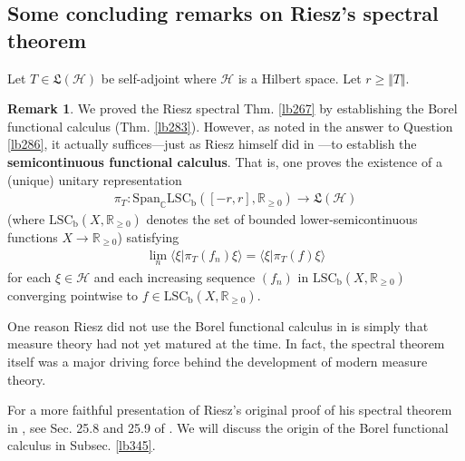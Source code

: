 \documentclass[12pt,b5paper,notitlepage]{article}
\theoremstyle{definition}
\newtheorem{rem}[df]{Remark}
\theoremstyle{plain}
\newcommand{\fk}{\mathfrak}
\newcommand{\Span}{\mathrm{Span}}
\newcommand{\bk}[1]{\langle {#1}\rangle}
\newcommand{\Cbb}{\mathbb C}
\newcommand{\Rbb}{\mathbb R}
\newcommand{\LSCb}{\mathrm{LSC}_{\mathrm b}}
\newcommand{\MH}{\mathcal H}
\newcommand{\hqed}{\hfill\qedsymbol}
\numberwithin{equation}{section}
\begin{document}
\subsection{Some concluding remarks on Riesz's spectral theorem}

Let $T\in\fk L(\MH)$ be self-adjoint where $\MH$ is a Hilbert space. Let $r\geq \Vert T\Vert$. 

\begin{rem}\label{lb287}
We proved the Riesz spectral Thm. \ref{lb267} by establishing the Borel functional calculus (Thm. \ref{lb283}). However, as noted in the answer to Question \ref{lb286}, it actually suffices---just as Riesz himself did in \cite{Rie13}---to establish the \textbf{semicontinuous functional calculus}.  That is, one proves the existence of a (unique) unitary representation
\begin{align*}
\pi_T:\Span_\Cbb\LSCb([-r,r],\Rbb_{\geq0})\rightarrow\fk L(\MH)
\end{align*}
(where $\LSCb(X,\Rbb_{\geq0})$ denotes the set of bounded lower-semicontinuous functions $X\rightarrow\Rbb_{\geq0}$) satisfying
\begin{align*}
\lim_n\bk{\xi|\pi_T(f_n)\xi}=\bk{\xi|\pi_T(f)\xi}
\end{align*}
for each $\xi\in\MH$ and each increasing sequence $(f_n)$ in $\LSCb(X,\Rbb_{\geq0})$ converging pointwise to $f\in\LSCb(X,\Rbb_{\geq0})$.

One reason Riesz did not use the Borel functional calculus in \cite{Rie13} is simply that measure theory had not yet matured at the time. In fact, the spectral theorem itself was a major driving force behind the development of modern measure theory.

For a more faithful presentation of Riesz’s original proof of his spectral theorem in \cite{Rie13}, see Sec. 25.8 and 25.9 of \cite{Gui-A}. We will discuss the origin of the Borel functional calculus in Subsec. \ref{lb345}. \hqed
\end{rem}
\end{document}
